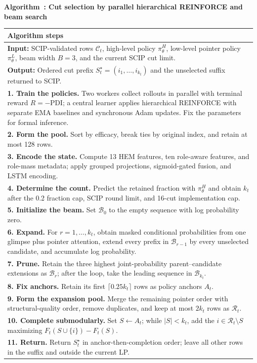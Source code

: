 \documentclass[final,5p,times,twocolumn]{elsarticle}
\newcommand{\pdi}{\mathrm{PDI}}
\newcounter{algorithm}
\newcommand{\algorithmtitle}[1]{\refstepcounter{algorithm}\noindent\textbf{Algorithm~\thealgorithm: #1}\par\smallskip}
\begin{document}
\begin{table}[!htbp]
\centering
\scriptsize
\setlength{\tabcolsep}{3pt}
\algorithmtitle{Cut selection by parallel hierarchical REINFORCE and beam search}
\label{alg:cut-selection-en}
\begin{tabular}{p{}}
\toprule
\textbf{Algorithm steps}\\
\midrule
\textbf{Input:} SCIP-validated rows $\mathcal C_t$, high-level policy $\pi_\theta^H$, low-level pointer policy $\pi_\theta^L$, beam width $B=3$, and the current SCIP cut limit.\\
\textbf{Output:} Ordered cut prefix $S_t^\star=(i_1,\ldots,i_{k_t})$ and the unselected suffix returned to SCIP.\\
\textbf{1. Train the policies.} Two workers collect rollouts in parallel with terminal reward $R=-\pdi$; a central learner applies hierarchical REINFORCE with separate EMA baselines and synchronous Adam updates. Fix the parameters for formal inference.\\
\textbf{2. Form the pool.} Sort by efficacy, break ties by original index, and retain at most 128 rows.\\
\textbf{3. Encode the state.} Compute 13 HEM features, ten role-aware features, and role-mass metadata; apply grouped projections, sigmoid-gated fusion, and LSTM encoding.\\
\textbf{4. Determine the count.} Predict the retained fraction with $\pi_\theta^H$ and obtain $k_t$ after the 0.2 fraction cap, SCIP round limit, and 16-cut implementation cap.\\
\textbf{5. Initialize the beam.} Set $\mathcal B_0$ to the empty sequence with log probability zero.\\
\textbf{6. Expand.} For $r=1,\ldots,k_t$, obtain masked conditional probabilities from one glimpse plus pointer attention, extend every prefix in $\mathcal B_{r-1}$ by every unselected candidate, and accumulate log probability.\\
\textbf{7. Prune.} Retain the three highest joint-probability parent--candidate extensions as $\mathcal B_r$; after the loop, take the leading sequence in $\mathcal B_{k_t}$.\\
\textbf{8. Fix anchors.} Retain its first $\lceil0.25k_t\rceil$ rows as policy anchors $A_t$.\\
\textbf{9. Form the expansion pool.} Merge the remaining pointer order with structural-quality order, remove duplicates, and keep at most $2k_t$ rows as $\mathcal R_t$.\\
\textbf{10. Complete submodularly.} Set $S\leftarrow A_t$; while $|S|<k_t$, add the $i\in\mathcal R_t\setminus S$ maximizing $F_t(S\cup\{i\})-F_t(S)$.\\
\textbf{11. Return.} Return $S_t^\star$ in anchor-then-completion order; leave all other rows in the suffix and outside the current LP.\\
\bottomrule
\end{tabular}
\end{table}
\end{document}
